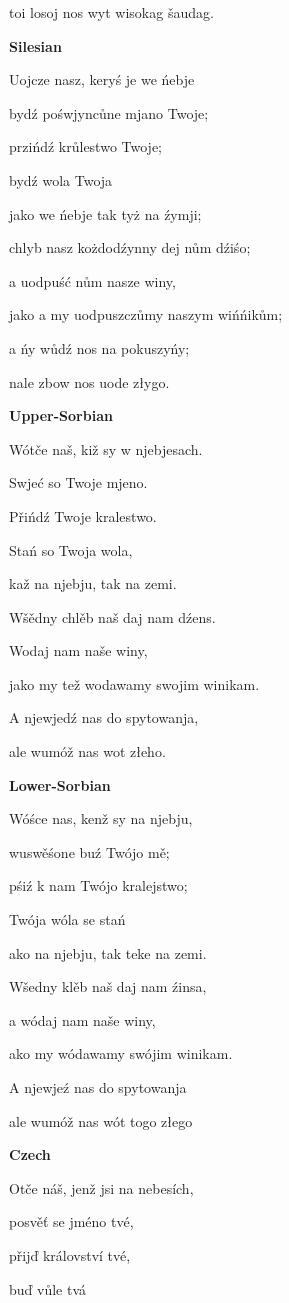 toi losoj nos wyt wisokag šaudag.

\textbf{Silesian}

Uojcze nasz, keryś je we ńebje

bydź pośwjyncůne mjano Twoje;

przińdź krůlestwo Twoje;

bydź wola Twoja

jako we ńebje tak tyż na źymji;

chlyb nasz kożdodźynny dej nům dźiśo;

a uodpuść nům nasze winy,

jako a my uodpuszczůmy naszym wińńikům;

a ńy wůdź nos na pokuszyńy;

nale zbow nos uode złygo.

\textbf{Upper-Sorbian}

Wótče naš, kiž sy w njebjesach.

Swjeć so Twoje mjeno.

Přińdź Twoje kralestwo.

Stań so Twoja wola,

kaž na njebju, tak na zemi.

Wšědny chlěb naš daj nam dźens.

Wodaj nam naše winy,

jako my tež wodawamy swojim winikam.

A njewjedź nas do spytowanja,

ale wumóž nas wot złeho.

\textbf{Lower-Sorbian}

Wóśce nas, kenž sy na njebju,

wuswěśone buź Twójo mě;

pśiź k nam Twójo kralejstwo;

Twója wóla se stań

ako na njebju, tak teke na zemi.

Wšedny klěb naš daj nam źinsa,

a wódaj nam naše winy,

ako my wódawamy swójim winikam.

A njewjeź nas do spytowanja

ale wumóž nas wót togo złego

\textbf{Czech}

Otče náš, jenž jsi na nebesích,

posvěť se jméno tvé,

přijď království tvé,

buď vůle tvá

